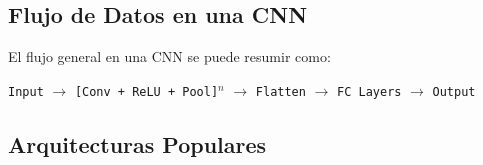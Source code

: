 \subsection{Flujo de Datos en una CNN}

El flujo general en una CNN se puede resumir como:

\begin{center}
\texttt{Input} $\rightarrow$ \texttt{[Conv + ReLU + Pool]}$^n$ $\rightarrow$ \texttt{Flatten} $\rightarrow$ \texttt{FC Layers} $\rightarrow$ \texttt{Output}
\end{center}
%









\subsection{Arquitecturas Populares}

